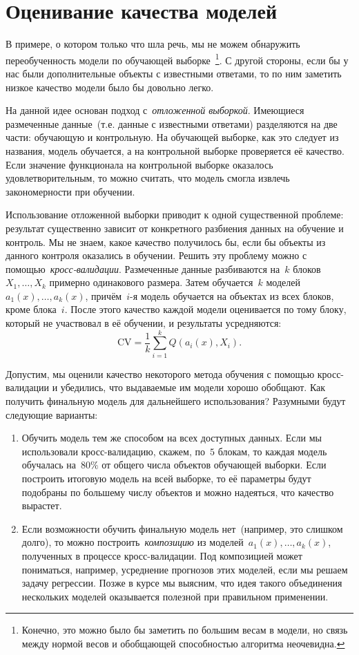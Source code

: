 \documentclass[12pt,fleqn]{article}
\begin{document}
\section{Оценивание качества моделей}

В примере, о котором только что шла речь, мы не можем обнаружить переобученность модели
по обучающей выборке~\footnote{Конечно, это можно было бы заметить по большим весам в модели,
но связь между нормой весов и обобщающей способностью алгоритма неочевидна.}.
С другой стороны, если бы у нас были дополнительные объекты с известными ответами,
то по ним заметить низкое качество модели было бы довольно легко.

На данной идее основан подход с~\emph{отложенной выборкой}.
Имеющиеся размеченные данные~(т.е. данные с известными ответами)
разделяются на две части: обучающую и контрольную.
На обучающей выборке, как это следует из названия, модель обучается,
а на контрольной выборке проверяется её качество.
Если значение функционала на контрольной выборке оказалось удовлетворительным,
то можно считать, что модель смогла извлечь закономерности при обучении.

Использование отложенной выборки приводит к одной существенной проблеме:
результат существенно зависит от конкретного разбиения данных на обучение и контроль.
Мы не знаем, какое качество получилось бы, если бы объекты из данного
контроля оказались в обучении.
Решить эту проблему можно с помощью~\emph{кросс-валидации}.
Размеченные данные разбиваются на~$k$ блоков~$X_1, \dots, X_k$ примерно одинакового размера.
Затем обучается~$k$ моделей~$a_1(x), \dots, a_k(x)$, причём~$i$-я модель обучается на объектах из всех блоков,
кроме блока~$i$.
После этого качество каждой модели оценивается по тому блоку, который не участвовал в её обучении,
и результаты усредняются:
\[
    \text{CV}
    =
    \frac{1}{k}
    \sum_{i = 1}^{k}
        Q\left( a_i(x), X_i \right).
\]

Допустим, мы оценили качество некоторого метода обучения с помощью кросс-валидации
и убедились, что выдаваемые им модели хорошо обобщают.
Как получить финальную модель для дальнейшего использования?
Разумными будут следующие варианты:
\begin{enumerate}
    \item Обучить модель тем же способом на всех доступных данных. Если мы использовали кросс-валидацию,
        скажем, по~$5$ блокам, то каждая модель обучалась на~$80\%$ от общего числа объектов обучающей выборки.
        Если построить итоговую модель на всей выборке, то её параметры будут подобраны
        по большему числу объектов и можно надеяться, что качество вырастет.
    \item Если возможности обучить финальную модель нет~(например, это слишком долго),
        то можно построить~\emph{композицию} из моделей~$a_1(x), \dots, a_k(x)$, полученных в процессе
        кросс-валидации.
        Под композицией может пониматься, например, усреднение прогнозов этих моделей,
        если мы решаем задачу регрессии.
        Позже в курсе мы выясним, что идея такого объединения нескольких моделей
        оказывается полезной при правильном применении.
\end{enumerate}
\end{document}
